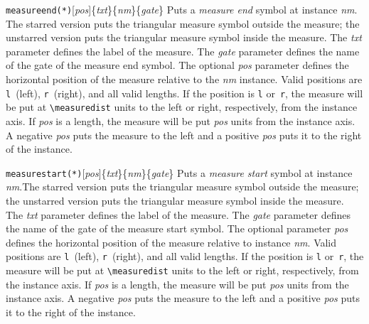 \documentclass[a4paper]{article}
\newcommand{\cmd}[1]{\texttt{\bslash #1}}
\newcommand{\opt}[1]{[#1]}
\newenvironment{defs}{%
  \begin{list}{}%
              {\setlength{\labelwidth}{0pt}%
               \setlength{\labelsep}{1em}%
               \setlength{\leftmargin}{1em}%
               \setlength{\parsep}{1ex}%
               \setlength{\listparindent}{0pt}%
               \setlength{\rightmargin}{0pt}%
               \renewcommand{\makelabel}[1]{##1}%
               \raggedright%
              }%
  }{%
  \end{list}}
\begin{document}
\begin{defs}
\item[\cmd{measureend(*)}\opt{\emph{pos}}\{\emph{txt}\}\{\emph{nm}\}\{\emph{gate}\}]
Puts a \emph{measure end} symbol at instance \emph{nm}. The starred
version puts the triangular measure symbol outside the measure; the
unstarred version puts the triangular measure symbol inside the
measure. The \emph{txt} parameter defines the label of the
measure. The \emph{gate} parameter defines the name of the gate of the
measure end symbol.  The optional \emph{pos} parameter defines the
horizontal position of the measure relative to the
\emph{nm} instance. Valid positions are \verb|l|~(left), \verb|r|~(right), and
all valid lengths. If the position is \verb|l| or~\verb|r|, the
measure will be put at \verb|\measuredist| units to the left or right,
respectively, from the instance axis. If \emph{pos} is a length, the
measure will be put \emph{pos} units from the instance axis. A
negative \emph{pos} puts the measure to the left and a positive
\emph{pos} puts it to the right of the instance.

\item[\cmd{measurestart(*)}\opt{\emph{pos}}\{\emph{txt}\}\{\emph{nm}\}\{\emph{gate}\}]
Puts a \emph{measure start} symbol at instance \emph{nm}.The starred
version puts the triangular measure symbol outside the measure; the
unstarred version puts the triangular measure symbol inside the
measure. The \emph{txt} parameter defines the label of the
measure. The \emph{gate} parameter defines the name of the gate of the
measure start symbol.  The optional parameter \emph{pos} defines the
horizontal position of the measure relative to instance
\emph{nm}. Valid positions are \verb|l|~(left), \verb|r|~(right), and
all valid lengths. If the position is \verb|l| or~\verb|r|, the
measure will be put at \verb|\measuredist| units to the left or right,
respectively, from the instance axis. If \emph{pos} is a length, the
measure will be put \emph{pos} units from the instance axis. A
negative \emph{pos} puts the measure to the left and a positive
\emph{pos} puts it to the right of the instance.


\end{defs}
\end{document}
